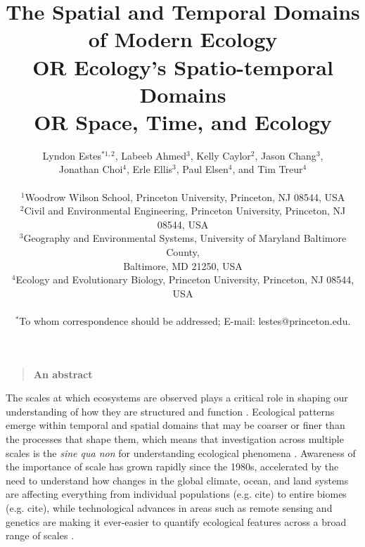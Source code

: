 \documentclass[12pt]{article}
\title{The Spatial and Temporal Domains of Modern Ecology \\
OR Ecology's Spatio-temporal Domains\\
OR Space, Time, and Ecology}
\author
{Lyndon Estes$^{\ast1, 2}$, Labeeb Ahmed$^{3}$, Kelly Caylor$^{2}$, Jason Chang$^{3}$, \\
Jonathan Choi$^{4}$, Erle Ellis$^{3}$, Paul Elsen$^{4}$, and Tim Treur$^{4}$ \\
\\
\normalsize{$^{1}$Woodrow Wilson School, Princeton University, Princeton, NJ 08544, USA}\\
\normalsize{$^{2}$Civil and Environmental Engineering, Princeton University, Princeton, NJ 08544, USA}\\
\normalsize{$^{3}$Geography and Environmental Systems, University of Maryland Baltimore County,}\\
\normalsize{Baltimore, MD 21250, USA}\\
\normalsize{$^{4}$Ecology and Evolutionary Biology, Princeton University, Princeton, NJ 08544, USA}\\
\\
\normalsize{$^\ast$To whom correspondence should be addressed; E-mail:  lestes@princeton.edu.}
}
\date{}
\newenvironment{sciabstract}{%
\begin{quote} \bf}
{\end{quote}}
\begin{document}
 


\baselineskip24pt


\maketitle 




\begin{sciabstract}
An abstract
\end{sciabstract}

\linenumbers
The scales at which ecosystems are observed plays a critical role in shaping our understanding of how they are structured and function \cite{levin_problem_1992,chave_problem_2013}.  Ecological patterns emerge within temporal and spatial domains that may be coarser or finer than the processes that shape them, which means that investigation across multiple scales is the \emph{sine qua non} for understanding ecological phenomena \cite{levin_problem_1992}. Awareness of the importance of scale has grown rapidly since the 1980s, accelerated by the need to understand how changes in the global climate, ocean, and land systems are affecting everything from individual populations (e.g. cite) to entire biomes (e.g. cite), while technological advances in areas such as remote sensing and genetics are making it ever-easier to quantify ecological features across a broad range of scales \cite{schneider_rise_2001,chave_problem_2013}.  
\end{document}
